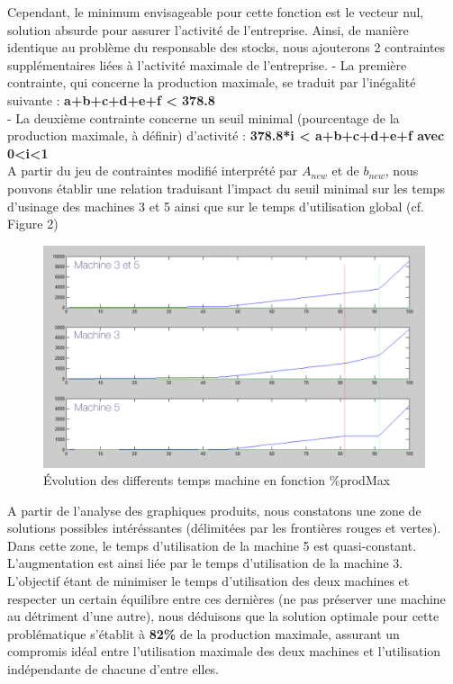 \documentclass[a4paper, 11pt]{article}
\begin{document}
Cependant, le minimum envisageable pour cette fonction est le vecteur nul, solution absurde pour assurer l'activité de l'entreprise. Ainsi, de manière identique au problème du responsable des stocks, nous ajouterons 2 contraintes supplémentaires liées à l'activité maximale de l'entreprise.
- La première contrainte, qui concerne la production maximale, se traduit par l'inégalité suivante :
\textbf{a+b+c+d+e+f < 378.8}\\
- La deuxième contrainte concerne un seuil minimal (pourcentage de la production maximale, à définir) d'activité :
\textbf{ 378.8*i < a+b+c+d+e+f avec 0<i<1}\\
A partir du jeu de contraintes modifié interprété par \textbf{$A_{new}$} et de \textbf{$b_{new}$}, nous pouvons établir une relation traduisant l'impact du seuil minimal sur les temps d'usinage des machines 3 et 5 ainsi que sur le temps d'utilisation global (cf. Figure 2)\\
\begin{figure}[H]
    \begin{center}
        \includegraphics[scale=0.38]{Pers}
        \caption{
            \label{fig} Évolution des differents temps machine en fonction \%prodMax
        }
    \end{center}
\end{figure}
A partir de l'analyse des graphiques produits, nous constatons une zone de solutions possibles intéréssantes (délimitées par les frontières rouges et vertes). Dans cette zone, le temps d'utilisation de la machine 5 est quasi-constant. L'augmentation est ainsi liée par le temps d'utilisation de la machine 3.\\
L'objectif étant de minimiser le temps d'utilisation des deux machines et respecter un certain équilibre entre ces dernières (ne pas préserver une machine au détriment d'une autre), nous déduisons que la solution optimale pour cette problématique s'établit à \textbf{82\%} de la production maximale, assurant un compromis idéal entre l'utilisation maximale des deux machines et l'utilisation indépendante de chacune d'entre elles.
\end{document}
